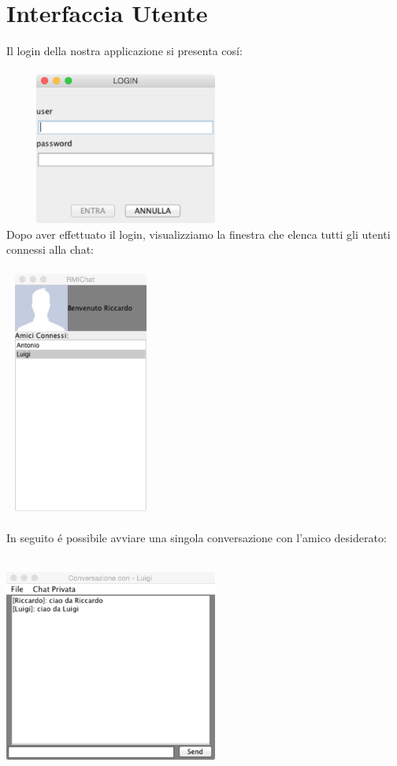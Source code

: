 \documentclass[a4paper, 12 pt, italian]{report}
\begin{document}
\section{Interfaccia Utente}
Il login della nostra applicazione si presenta cos\'i:\\\\
\includegraphics[height=50mm, width=80mm]{login}
\\
Dopo aver effettuato il login, visualizziamo la finestra che elenca tutti gli utenti connessi alla chat:\\\\
\includegraphics[height=80mm, width=50mm]{window}\\\\
In seguito \'e possibile avviare una singola conversazione con l'amico desiderato:\\\\
\includegraphics[height=70mm, width=70mm]{conv}\\
\end{document}
